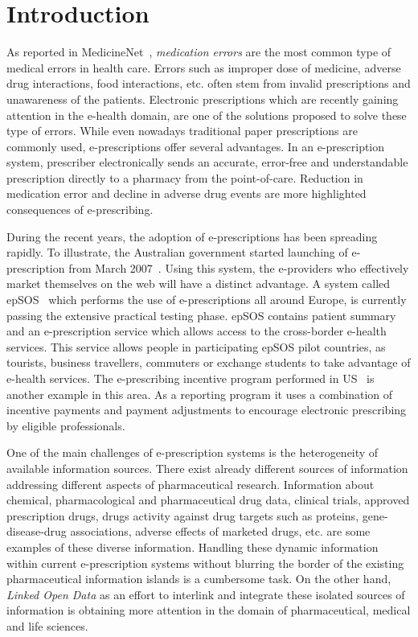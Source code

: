 \documentclass[conference]{IEEEtran}
\begin{document}
\section{Introduction}
\label{intro}

As reported in MedicineNet~\cite{medicationErrors}, \emph{medication errors} are the most common type of medical errors in health care.
Errors such as improper dose of medicine, adverse drug interactions, food interactions, etc. often stem from invalid prescriptions and unawareness of the patients.
Electronic prescriptions which are recently gaining attention in the e-health domain, are one of the solutions proposed to solve these type of errors.
While even nowadays traditional paper prescriptions are commonly used, e-prescriptions offer several advantages.
In an e-prescription system, prescriber electronically sends an accurate, error-free and understandable prescription directly to a pharmacy from the point-of-care.
Reduction in medication error and decline in adverse drug events are more highlighted consequences of e-prescribing.

During the recent years, the adoption of e-prescriptions has been spreading rapidly.
To illustrate, the Australian government started launching of e-prescription from March 2007~\cite{medicare}.
Using this system, the e-providers who effectively market themselves on the web will have a distinct advantage.
A system called epSOS~\cite{epsos} which performs the use of e-prescriptions all around Europe, is currently passing the extensive practical testing phase.
epSOS contains patient summary and an e-prescription service which allows access to the cross-border e-health services.
This service allows people in participating epSOS pilot countries, as tourists, business travellers, commuters or exchange students to take advantage of e-health services.
The e-prescribing incentive program performed in US~\cite{epincentive} is another example in this area.
As a reporting program it uses a combination of incentive payments and payment adjustments to encourage electronic prescribing by eligible professionals.

One of the main challenges of e-prescription systems is the heterogeneity of available information sources.
There exist already different sources of information addressing different aspects of pharmaceutical research.
Information about chemical, pharmacological and pharmaceutical drug data, clinical trials, approved prescription drugs, drugs activity against drug targets such as proteins, gene-disease-drug associations, adverse effects of marketed drugs, etc. are some examples of these diverse information.
Handling these dynamic information within current e-prescription systems without blurring the border of the existing pharmaceutical information islands is a cumbersome task.
On the other hand, \emph{Linked Open Data} as an effort to interlink and integrate these isolated sources of information is obtaining more attention in the domain of pharmaceutical, medical and life sciences.
\end{document}
